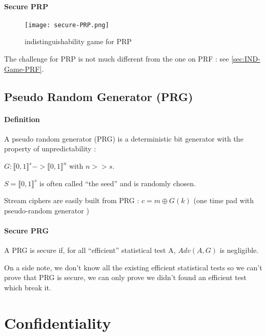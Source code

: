 \paragraph{Secure PRP \\}


\begin{figure}[ht!]
	\centering
		\texttt{[image: secure-PRP.png]}
	\caption{indistinguishability game for PRP}
	\label{fig:Cipher}
\end{figure}

The challenge for PRP is not much different from the one on PRF : see \ref{sec:IND-Game-PRF}.

\subsection{Pseudo Random Generator     (PRG)} 


\paragraph{Definition \\}

A pseudo random generator (PRG) is a deterministic bit generator with the property of  unpredictability :
\begin{mydef}
$ G : \llbracket  0,1 \rrbracket ^s -> \llbracket  0,1 \rrbracket ^n $  with  $n>>s$. 

\flushright	 $S = \llbracket  0,1 \rrbracket ^s$ is often called ``the seed'' and is randomly chosen. 

\end{mydef}

Stream ciphers are easily built from PRG : $c = m \oplus G(k) $  (one time pad with pseudo-random generator )


\paragraph{Secure PRG \\}
A PRG is secure if, for all ``efficient'' statistical test A, $Adv(A,G)$ is negligible.

On a side note, we don't know all the existing efficient statistical tests so we can't prove that PRG is secure, we can only prove we didn't found an efficient test which break it.


\section{Confidentiality}
